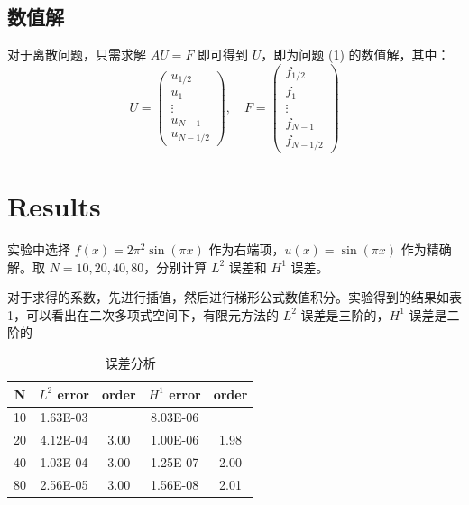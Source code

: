 \documentclass[11pt]{ctexart}
\begin{document}
\subsection{数值解}
对于离散问题，只需求解 $ AU = F $ 即可得到 $ U $，即为问题 (1) 的数值解，其中：
\begin{equation}
     U= \begin{pmatrix}
          u_{1/2}\\
          u_1\\
          \vdots\\
          u_{N-1}\\
          u_{N-1/2}
     \end{pmatrix}, \quad
     F= \begin{pmatrix}
          f_{1/2}\\
          f_1\\
          \vdots\\
          f_{N-1}\\
          f_{N-1/2}
     \end{pmatrix}
\end{equation}

\section{Results}

实验中选择 $ f(x) = 2\pi^2\sin(\pi x) $ 作为右端项，$ u(x) = \sin(\pi x) $ 作为精确解。取 $ N = 10,20,40,80 $，分别计算 $ L^2 $ 误差和 $ H^1 $ 误差。

对于求得的系数，先进行插值，然后进行梯形公式数值积分。实验得到的结果如表1，可以看出在二次多项式空间下，有限元方法的 $ L^2 $ 误差是三阶的，$ H^1 $ 误差是二阶的

\begin{table}[htbp]
     \centering
	\caption{误差分析}
	  \begin{tabular}{|c|cc|cc|}
	  \toprule
	  N     & \multicolumn{1}{c}{$L^2$ error} & \multicolumn{1}{c|}{order} & \multicolumn{1}{c}{$H^1$ error} & \multicolumn{1}{c|}{order} \\
       \midrule
       10    & 1.63E-03 &       & 8.03E-06 &  \\
       20    & 4.12E-04 & 3.00 & 1.00E-06 & 1.98 \\
       40    & 1.03E-04 & 3.00 & 1.25E-07 & 2.00 \\
       80    & 2.56E-05 & 3.00 & 1.56E-08 & 2.01 \\   
       \bottomrule
       \end{tabular}%
       \label{tab:error}%
\end{table}%
\end{document}
